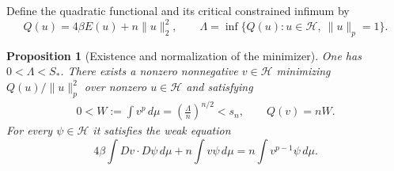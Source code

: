 \documentclass[11pt]{article}
\numberwithin{equation}{section}
\newtheorem{proposition}[theorem]{Proposition}
\theoremstyle{definition}
\theoremstyle{remark}
\begin{document}
Define the quadratic functional and its critical constrained infimum by
\begin{equation}
 Q(u)=4\beta E(u)+n\|u\|_2^2,
 \qquad
 \Lambda=\inf\{Q(u):u\in\mathcal H,\ \|u\|_p=1\}.
 \label{eq:critical-variational-problem}
\end{equation}

\begin{proposition}[Existence and normalization of the minimizer]
\label{prop:minimizer}
One has $0<\Lambda<S_*$.  There exists a nonzero nonnegative
$v\in\mathcal H$ minimizing $Q(u)/\|u\|_p^2$ over nonzero $u\in\mathcal H$
and satisfying
\begin{equation}
 \begin{split}
 0<W:=\int v^p\,d\mu
       =\left(\frac\Lambda n\right)^{n/2}<s_n,
 \qquad Q(v)=nW.
 \end{split}
 \label{eq:minimizer-normalization}
\end{equation}
For every $\psi\in\mathcal H$ it satisfies the weak equation
\begin{equation}
 4\beta\int Dv\cdot D\psi\,d\mu+n\int v\psi\,d\mu
   =n\int v^{p-1}\psi\,d\mu.
 \label{eq:euler}
\end{equation}
\end{proposition}
\end{document}

